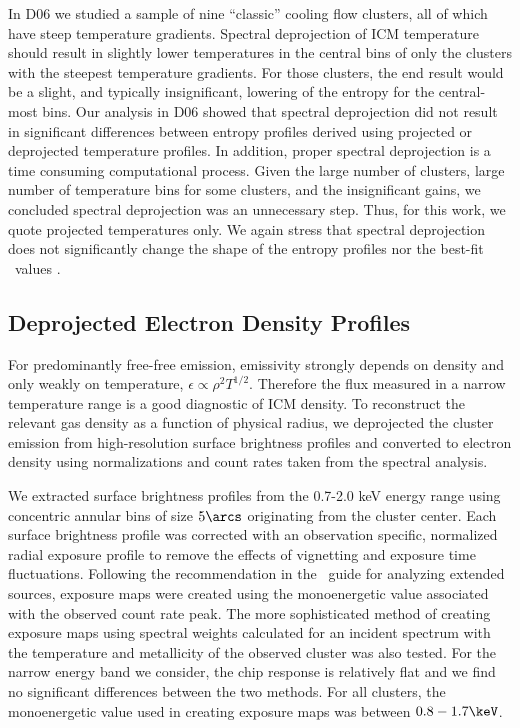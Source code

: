 \documentclass{emulateapj}
\begin{document}
In D06 we studied a sample of nine ``classic'' cooling flow clusters,
all of which have steep temperature gradients. Spectral deprojection
of ICM temperature should result in slightly lower temperatures in the
central bins of only the clusters with the steepest temperature
gradients. For those clusters, the end result would be a slight, and
typically insignificant, lowering of the entropy for the central-most
bins. Our analysis in D06 showed that spectral deprojection did not
result in significant differences between entropy profiles derived
using projected or deprojected temperature profiles. In addition,
proper spectral deprojection is a time consuming computational
process. Given the large number of clusters, large number of
temperature bins for some clusters, and the insignificant gains, we
concluded spectral deprojection was an unnecessary step. Thus, for
this work, we quote projected temperatures only. We again stress that
spectral deprojection does not significantly change the shape of the
entropy profiles nor the best-fit \kna\ values \citep[see][]{d06}.

\subsection{Deprojected Electron Density Profiles}
\label{sec:dene}

For predominantly free-free emission, emissivity strongly depends on
density and only weakly on temperature, $\epsilon \propto \rho^2
T^{1/2}$. Therefore the flux measured in a narrow temperature range is
a good diagnostic of ICM density. To reconstruct the relevant gas
density as a function of physical radius, we deprojected the cluster
emission from high-resolution surface brightness profiles and
converted to electron density using normalizations and count rates
taken from the spectral analysis.

We extracted surface brightness profiles from the 0.7-2.0 keV energy
range using concentric annular bins of size $5\arcs$ originating from
the cluster center. Each surface brightness profile was corrected with
an observation specific, normalized radial exposure profile to remove
the effects of vignetting and exposure time fluctuations. Following
the recommendation in the \ciao\ guide for analyzing extended sources,
exposure maps were created using the monoenergetic value associated
with the observed count rate peak. The more sophisticated method of
creating exposure maps using spectral weights calculated for an
incident spectrum with the temperature and metallicity of the observed
cluster was also tested. For the narrow energy band we consider, the
chip response is relatively flat and we find no significant
differences between the two methods. For all clusters, the
monoenergetic value used in creating exposure maps was between
$0.8-1.7\keV$.
\end{document}
